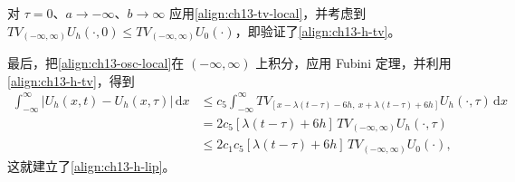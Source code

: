 \documentclass[../../main.tex]{subfiles}
\begin{document}
对 $\tau=0$、$a\to-\infty$、$b\to\infty$ 应用\eqref{align:ch13-tv-local}，并考虑到 $TV_{(-\infty,\infty)}U_h(\cdot,0)\leqslant TV_{(-\infty,\infty)}U_0(\cdot)$，即验证了\eqref{align:ch13-h-tv}。

最后，把\eqref{align:ch13-osc-local}在 $(-\infty,\infty)$ 上积分，应用 Fubini 定理，并利用\eqref{align:ch13-h-tv}，得到
\begin{align}
\int_{-\infty}^{\infty}|U_h(x,t)-U_h(x,\tau)|\,\mathrm{d}x
&\leqslant c_5\int_{-\infty}^{\infty}TV_{[x-\lambda(t-\tau)-6h,\ x+\lambda(t-\tau)+6h]}U_h(\cdot,\tau)\,\mathrm{d}x\nonumber\\
&=2c_5[\lambda(t-\tau)+6h]\,TV_{(-\infty,\infty)}U_h(\cdot,\tau)\nonumber\\
&\leqslant2c_1c_5[\lambda(t-\tau)+6h]\,TV_{(-\infty,\infty)}U_0(\cdot),
\label{align:ch13-lip-final}
\end{align}
这就建立了\eqref{align:ch13-h-lip}。
\end{document}
